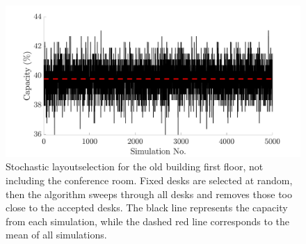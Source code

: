 \documentclass[11pt,a4paper]{article}
\begin{document}
\begin{figure}[h]
         \centering
         \includegraphics[width=1\textwidth]{random_order_sim.png}
         \caption{Stochastic layoutselection for the old building first floor, not including the conference room. Fixed desks are selected at random, then the algorithm sweeps through all desks and removes those too close to the accepted desks. The black line represents the capacity from each simulation, while the dashed red line corresponds to the mean of all simulations.}
         \label{fig:Stochastic_sims}
\end{figure}
\end{document}
